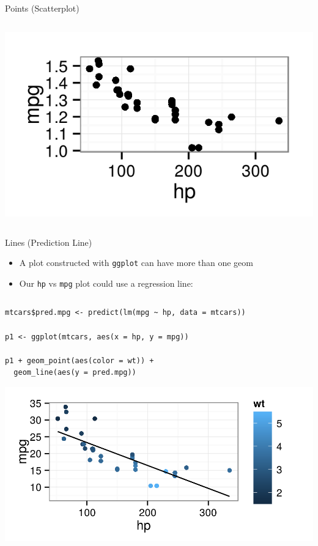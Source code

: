 \documentclass[table,smaller]{beamer}
\begin{document}
\begin{frame}[fragile,label=sec-2-3]{Points (Scatterplot)}
\begin{columns}
\begin{column}{0.5\textwidth}
\begin{columns}
\begin{block}{}
\includegraphics[width=.9\linewidth]{images/overrideScatterDefault.png}
\end{block} \end{columns}
\end{column}
\end{columns}
\end{frame}

\begin{frame}[fragile,label=sec-2-4]{Lines (Prediction Line)}
 \begin{itemize}
\item A plot constructed with \texttt{ggplot} can have more than one geom

\item Our \texttt{hp} vs \texttt{mpg} plot could use a regression line:
\end{itemize}

\begin{columns}  \begin{block}{}

\begin{verbatim}
mtcars$pred.mpg <- predict(lm(mpg ~ hp, data = mtcars))

p1 <- ggplot(mtcars, aes(x = hp, y = mpg))

p1 + geom_point(aes(color = wt)) +
  geom_line(aes(y = pred.mpg))
\end{verbatim}

\includegraphics[width=.9\linewidth]{images/mtcarsLayers.png}

\end{block} \end{columns}
\end{frame}
\end{document}
